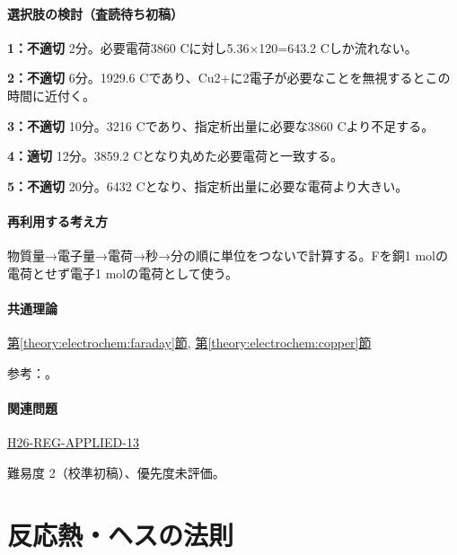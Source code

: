 \paragraph{選択肢の検討（査読待ち初稿）}\mbox{}\par

\noindent\textbf{1：不適切} 2分。必要電荷3860 Cに対し5.36×120=\allowbreak{}643.2 Cしか流れない。\par

\noindent\textbf{2：不適切} 6分。1929.6 Cであり、Cu2+に2電子が必要なことを無視するとこの時間に近付く。\par

\noindent\textbf{3：不適切} 10分。3216 Cであり、指定析出量に必要な3860 Cより不足する。\par

\noindent\textbf{4：適切} 12分。3859.2 Cとなり丸めた必要電荷と一致する。\par

\noindent\textbf{5：不適切} 20分。6432 Cとなり、指定析出量に必要な電荷より大きい。\par

\paragraph{再利用する考え方} 物質量→電子量→電荷→秒→分の順に単位をつないで計算する。Fを銅1 molの電荷とせず電子1 molの電荷として使う。

\paragraph{共通理論} \hyperref[theory:electrochem:faraday]{第\ref*{theory:electrochem:faraday}節}, \hyperref[theory:electrochem:copper]{第\ref*{theory:electrochem:copper}節}

\par 参考：\cite{mit_redox2014}。

\paragraph{関連問題} \hyperref[q:h26-reg-applied-13]{H26-REG-APPLIED-13}

\par 難易度 2（校準初稿）、優先度未評価。

\section{反応熱・ヘスの法則}

